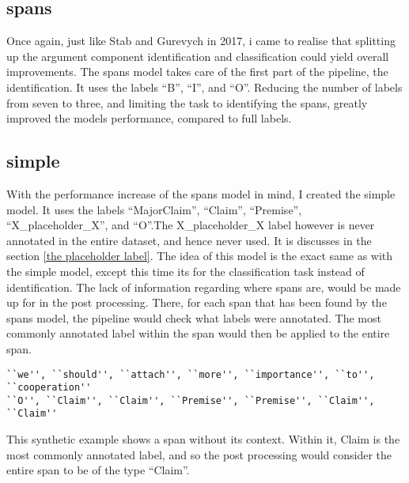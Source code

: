 \documentclass[12]{article}
\theoremstyle{mytheoremstyle}
\theoremstyle{mytheoremstyle}
\theoremstyle{myproblemstyle}
\begin{document}
  \subsection{spans} \label{spans}
  Once again, just like Stab and Gurevych in 2017, i came to realise that splitting up the argument component identification and classification could yield overall improvements. The spans model takes care of the first part of the pipeline, the identification. It uses the labels ``B'', ``I'', and ``O''. Reducing the number of labels from seven to three, and limiting the task to identifying the spans, greatly improved the models performance, compared to full labels.
  \subsection{simple} \label{simple}
  With the performance increase of the spans model in mind, I created the simple model. It uses the labels ``MajorClaim'', ``Claim'', ``Premise'', ``X\_placeholder\_X'', and ``O''.The X\_placeholder\_X label however is never annotated in the entire dataset, and hence never used. It is discusses in the section \ref{the placeholder label}.
 The idea of this model is the exact same as with the simple model, except this time its for the classification task instead of identification. The lack of information regarding where spans are, would be made up for in the post processing. There, for each span that has been found by the spans model, the pipeline would check what labels were annotated. The most commonly annotated label within the span would then be applied to the entire span.  
  \begin{verbatim}
``we'', ``should'', ``attach'', ``more'', ``importance'', ``to'', ``cooperation''
``O'', ``Claim'', ``Claim'', ``Premise'', ``Premise'', ``Claim'', ``Claim''
  \end{verbatim}
  This synthetic example shows a span without its context. Within it, Claim is the most commonly annotated label, and so the post processing would consider the entire span to be of the type ``Claim''.
\end{document}
